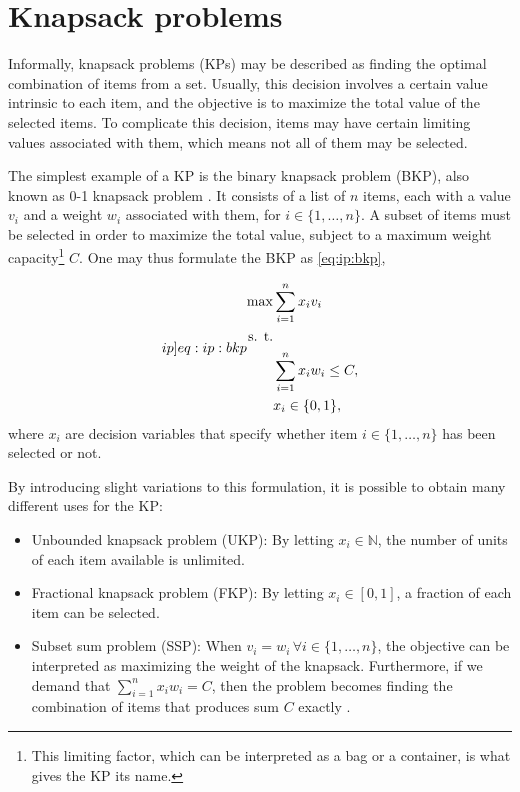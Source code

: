 \section{Knapsack problems}

Informally, knapsack problems (KPs) may be described as finding the optimal combination of items from a set. Usually, this decision involves a certain value intrinsic to each item, and the objective is to maximize the total value of the selected items. To complicate this decision, items may have certain limiting values associated with them, which means not all of them may be selected.

The simplest example of a KP is the binary knapsack problem (BKP), also known as 0-1 knapsack problem \cite{ASSI2018}. It consists of a list of $n$ items, each with a value $v_i$ and a weight $w_i$ associated with them, for $i \in \{1,\dots,n\}$. A subset of items must be selected in order to maximize the total value, subject to a maximum weight capacity\footnote{This limiting factor, which can be interpreted as a bag or a container, is what gives the KP its name.} $C$. One may thus formulate the BKP as \cref{eq:ip:bkp},

\begin{align}
    \label[ip]{eq:ip:bkp}
    \begin{split}
        \max &\sum_{i=1}^{n}x_iv_i\\
        \textrm{s. t.}&\\
        &\sum_{i=1}^{n}x_iw_i \leq C,\\
        &x_i \in \{0,1\},
    \end{split}
\end{align}
where $x_i$ are decision variables that specify whether item $i \in \{1,\dots,n\}$ has been selected or not.

By introducing slight variations to this formulation, it is possible to obtain many different uses for the KP:

\begin{itemize}
    \item Unbounded knapsack problem (UKP): By letting $x_i \in \mathbb{N}$, the number of units of each item available is unlimited.
    \item Fractional knapsack problem (FKP): By letting $x_i \in [0, 1]$, a fraction of each item can be selected.
    \item Subset sum problem (SSP): When $v_i = w_i \, \forall i \in \{1,\dots,n\}$, the objective can be interpreted as maximizing the weight of the knapsack. Furthermore, if we demand that $\sum_{i=1}^{n}x_iw_i = C$, then the problem becomes finding the combination of items that produces sum $C$ exactly \cite{FEOFILOFF2020b}.
\end{itemize}

